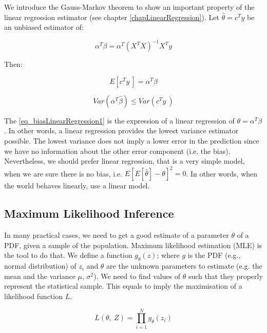 We introduce the Gauss-Markov theorem to show an important property of the linear regression estimator (see chapter \ref{chapLinearRegression}). Let $\hat{\theta}=c^Ty$ be an unbiased estimator of:

\begin{equation}
\alpha^T\beta=\alpha^T\left(X^TX\right)^{-1}X^Ty
\label{eq_biasLinearRegression1}
\end{equation}

Then:

\begin{equation}
E\left[c^Ty\ \right]=\alpha^T\beta
\label{eq_biasLinearRegression2}
\end{equation}

\begin{equation}
Var\left(\alpha^T\hat{\beta}\right)\le Var(c^Ty\ )
\label{eq_biasLinearRegression3}
\end{equation}

The \ref{eq_biasLinearRegression1} is the expression of a linear regression of $\theta=\alpha^T\beta$. In other words, a linear regression  provides the lowest variance estimator possible. The lowest variance does not imply a lower error in the prediction since we have no information about the other error component (i.e. the bias). Nevertheless, we should prefer linear regression, that is a very simple model, when we are sure there is no bias, i.e. $E\left[E\left[\hat{\theta}\right]-\theta\right]^2=0$. In other words, when the world behaves linearly, use a linear model.

\subsection{Maximum Likelihood Inference}
In many practical cases, we need to get a good estimate of a parameter $\theta$ of a PDF, given a sample of the population. Maximum likelihood estimation (MLE) is the tool to do that. We define a function $g_\theta(z)$; where $g$ is the PDF (e.g., normal distribution) of $z_i$ and $\theta$ are the unknown parameters to estimate (e.g. the mean and the variance $\mu$, $\sigma^2$). We need to find values of $\theta$ such that they properly represent the statistical sample. This equals to imply the maximisation of a likelihood function $L$.

\begin{equation}
L\left(\theta,\ Z\right)=\prod_{i=1}^{N}{g_\theta(z_i)}
\label{eq_MLE1}
\end{equation}

